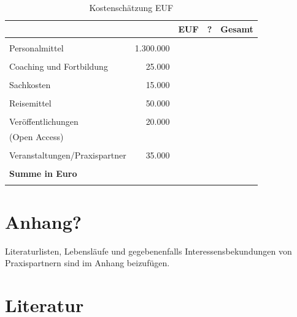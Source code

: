 \documentclass[a4paper,11pt,twoside]{scrartcl}
\begin{document}
\begin{table}[h]
\begin{center}
  \caption{Kostenschätzung EUF}
\begin{tabular}[h]{lrrrr}
&& EUF & ? & Gesamt\\
\hline
\hline
&&&&\\
 Personalmittel & 1.300.000 & & &\\
 \hline
 &&&&\\
 Coaching und Fortbildung & 25.000& & &\\
 \hline
 &&&&\\
 Sachkosten & 15.000& & &\\
 \hline
 &&&&\\
 Reisemittel & 50.000 & & &\\
 \hline
 &&&&\\
 Veröffentlichungen & 20.000 &&&\\
 (Open Access) && & &\\
 \hline
 &&&&\\
Veranstaltungen/Praxispartner & 35.000& &&\\
 \hline
 \hline
 &&&&\\
 \textbf{Summe in Euro}&& \textbf{}&\textbf{}&\underline{\textbf{}}\\
 \label{tab:kostenkalkulation}
\end{tabular}
\end{center}
\end{table}

\clearpage

\appendix
\section{Anhang?}

Literaturlisten, Lebensläufe und gegebenenfalls Interessensbekundungen von Praxispartnern sind im Anhang beizufügen.

\clearpage
\section{Literatur} \label{sec:lit}

\end{document}
